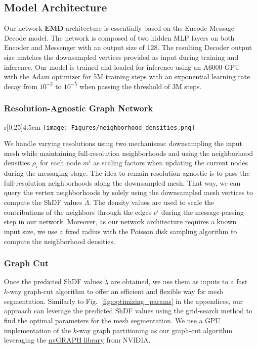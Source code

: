 \subsection{Model Architecture}
Our network $\textbf{EMD}$ architecture is essentially based on the Encode-Message-Decode model. The network is composed of two hidden MLP layers on both Encoder and Messenger with an output size of 128. The resulting Decoder output size matches the downsampled vertices provided as input during training and inference. Our model is trained and loaded for inference using an A6000 GPU with the Adam optimizer for 5M training steps with an exponential learning rate decay from $10^{-3}$ to $10^{-5}$ when passing the threshold of 3M steps.

\subsubsection{\textbf{Resolution-Agnostic Graph Network}}
\begin{wrapfigure}[7]{r}[0.25\columnwidth]{4.5cm}
\vspace*{-0.6cm}
\hspace*{-0.6cm}
\texttt{[image: Figures/neighborhood\_densities.png]} 
\label{fig:neighborhood}
\end{wrapfigure}
We handle varying resolutions using two mechanisms: downsampling the input mesh while maintaining full-resolution neighborhoods and using the neighborhood densities $\rho_i$ for each node $m^i$ as scaling factors when updating the current nodes during the messaging stage. The idea to remain resolution-agnostic is to pass the full-resolution neighborhoods along the downsampled mesh. That way, we can query the vertex neighborhoods by solely using the downsampled mesh vertices to compute the ShDF values $\tilde{\Lambda}$. The density values are used to scale the contributions of the neighbors through the edges $e^i$ during the message-passing step in our network. Moreover, as our network architecture requires a known input size, we use a fixed radius with the Poisson disk sampling algorithm to compute the neighborhood densities.

\subsubsection{\textbf{Graph Cut}}
\label{sec:graph_cut}
Once the predicted ShDF values $\tilde{\lambda}$ are obtained, we use them as inputs to a fast $k$-way graph-cut algorithm to offer an efficient and flexible way for mesh segmentation. Similarly to Fig.~\ref{fig:optimizing_params} in the appendices, our approach can leverage the predicted ShDF values using the grid-search method to find the optimal parameters for the mesh segmentation. We use a GPU implementation of the $k$-way graph partitioning as our graph-cut algorithm leveraging the \href{https://developer.nvidia.com/nvgraph}{nvGRAPH library} from NVIDIA.

